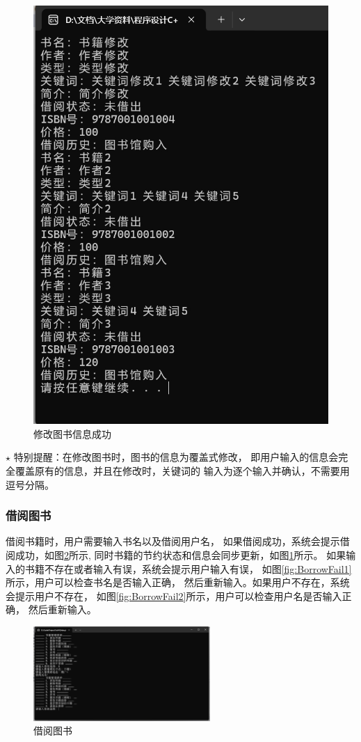 \documentclass[12pt,twoside]{ctexart}
\begin{document}
\begin{figure}[H]
\begin{minipage}{0.48\textwidth}
        \includegraphics[width=0.8\linewidth]{Book/11modifybook.png}
        \caption{修改图书信息成功}
        \label{fig:ModifySucc}
    \end{minipage}
\end{figure}

$\star$ 特别提醒：在修改图书时，图书的信息为覆盖式修改，
即用户输入的信息会完全覆盖原有的信息，并且在修改时，关键词的
输入为逐个输入并确认，不需要用逗号分隔。

\subsubsection{借阅图书}

借阅书籍时，用户需要输入书名以及借阅用户名，
如果借阅成功，系统会提示借阅成功，如图\ref{fig:Borrow}所示,
同时书籍的节约状态和信息会同步更新，如图\ref{fig:ModifySucc}所示。
如果输入的书籍不存在或者输入有误，系统会提示用户输入有误，
如图\ref{fig:BorrowFail1}所示，用户可以检查书名是否输入正确，
然后重新输入。如果用户不存在，系统会提示用户不存在，
如图\ref{fig:BorrowFail2}所示，用户可以检查用户名是否输入正确，
然后重新输入。


\begin{figure}[H]
    \centering
    \includegraphics[width=0.6\textwidth]{Book/borrowsucc.png}
    \caption{借阅图书}
    \label{fig:Borrow}
\end{figure}
\end{document}
